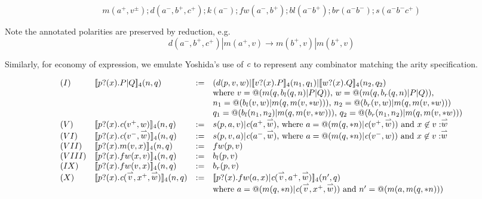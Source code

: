 \documentclass{llncs}
\makeatletter
\newcommand{\ldb}{[\![}
\newcommand{\rdb}{]\!]}
\newcommand{\binpar}[2]{#1 | #2}
\newcommand{\prefix}[3]{#1?(#2) . #3}
\newcommand{\quotep}[1]{\mathsf{@}#1}
\newcommand{\meaningof}[1]{\ldb #1 \rdb}
\newcommand{\vect}[1]{\stackrel{\rightharpoonup}{#1}}
\makeatother
\begin{document}
\[m(a^{+},v^{\pm});d(a^{−},b^{+},c^{+});k(a^{−});fw(a^{−},b^{+});bl(a^{−}b^{+});br(a^{−}b^{−});s(a^{−}b^{−}c^{+})\]

Note the annotated polarities are preserved by reduction, e.g.
\[\binpar{d(a^{−},b^{+},c^{+})}{m(a^{+},v)} \to \binpar{m(b^{+},v)}{m(b^{+},v)}\]

Similarly, for economy of expression, we emulate Yoshida's use of
$\emph{c}$ to represent any combinator matching the arity
specification. 

\[\begin{array}{llrl}
(I)&  \meaningof{\prefix{p}{x}{\binpar{P}{Q}}}_4(n, q) 
    & := & 
    (d(p,v,w)|\binpar{\meaningof{\prefix{v}{x}{P}}_{4}(n_{1}, q_{1})}{\meaningof{\prefix{w}{x}{Q}}_{4}(n_{2}, q_{2}) } \\
    & & & \mbox{where $v = \quotep{(m(q,\binpar{b_{l}(q,n)}{\binpar{P}{Q}}))}$, $w = \quotep{(m(q,\binpar{b_{r}(q,n)}{\binpar{P}{Q}}))}$,} \\
    & & &\mbox{$n_{1} = \quotep{(\binpar{b_{l}(v,w)}{m(q,m(v,*w))})}$, $n_{2} = \quotep{(\binpar{b_{r}(v,w)}{m(q,m(v,*w))})}$} \\
    & & &\mbox{$q_{1} = \quotep{(\binpar{b_{l}(n_{1},n_{2})}{m(q,m(v,*w))})}$, $q_{2} = \quotep{(\binpar{b_{r}(n_{1},n_{2})}{m(q,m(v,*w))})}$} \\
(V)&  \meaningof{\prefix{p}{x}{\emph{c}(v^{+},w)}}_4(n, q) 
    & := & 
    s(p,a,v)|\emph{c}(a^{+},\vect{w})
    \mbox{, where $a = @(\binpar{m(q,*n)}{\emph{c}(v^{+},\vect{w})})$ and $x \not\in v : \vect{w}$}\\
(VI)&  \meaningof{\prefix{p}{x}{\emph{c}(v^{-},\vect{w})}}_4(n, q) 
    & := & 
    s(p,v,a)|\emph{c}(a^{-},\vect{w})
    \mbox{, where $a = @(m(q,*n)|\emph{c}(v^{-},w))$ and $x \not\in v : \vect{w}$} \\
(VII)&  \meaningof{\prefix{p}{x}{m(v,x)}}_4(n, q) 
    & := & 
    fw(p,v) \\
(VIII)&  \meaningof{\prefix{p}{x}{fw(x,v)}}_4(n, q) 
    & := & 
    b_{l}(p,v) \\
(IX)&  \meaningof{\prefix{p}{x}{fw(v,x)}}_4(n, q) 
    & := & 
    b_{r}(p,v) \\
(X)&  \meaningof{\prefix{p}{x}{\emph{c}(\vect{v},x^{+},\vect{w})}}_4(n, q) 
    & := & 
    \meaningof{\prefix{p}{x}{\binpar{fw(a,x)}{\emph{c}(\vect{v},a^{+},\vect{w})}}}_4(n', q)\\
    & & & \mbox{where $a = @(\binpar{m(q,*n)}{\emph{c}(\vect{v},x^{+},\vect{w})})$} \mbox{ and $n'= \quotep{(m(a,m(q,*n)))}$} \\

\end{array}\]
\end{document}
